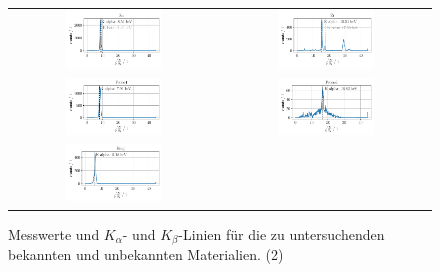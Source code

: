 \documentclass[ngerman]{scrartcl}
\begin{document}
\begin{figure}[H]
    \centering
    \begin{tabular}{cc}
        \includegraphics[width=0.48\textwidth]{../plots/roentgen_data_7.pdf}  &
        \includegraphics[width=0.48\textwidth]{../plots/roentgen_data_8.pdf}    \\
        \includegraphics[width=0.48\textwidth]{../plots/roentgen_data_9.pdf}  &
        \includegraphics[width=0.48\textwidth]{../plots/roentgen_data_10.pdf}   \\
        \includegraphics[width=0.48\textwidth]{../plots/roentgen_data_11.pdf} & \\
    \end{tabular}
    \caption{Messwerte und $K_{\alpha}$- und $K_{\beta}$-Linien für die zu untersuchenden bekannten und unbekannten Materialien. (2)}
    \label{fig:roentgenfloureszenz2}
\end{figure}
\end{document}
